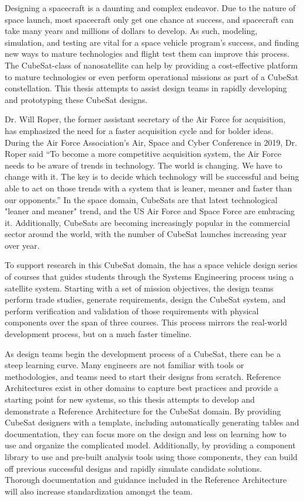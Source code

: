 Designing a spacecraft is a daunting and complex endeavor. Due to the nature of space launch, most spacecraft only get one chance at success, and spacecraft can take many years and millions of dollars to develop. As such, modeling, simulation, and testing are vital for a space vehicle program's success, and finding new ways to mature technologies and flight test them can improve this process. The CubeSat-class of nanosatellite can help by providing a cost-effective platform to mature technologies or even perform operational missions as part of a CubeSat constellation. This thesis attempts to assist design teams in rapidly developing and prototyping these CubeSat designs. 

Dr. Will Roper, the former assistant secretary of the Air Force for acquisition, has emphasized the need for a faster acquisition cycle and for bolder ideas. During the Air Force Association’s Air, Space and Cyber Conference in 2019, Dr. Roper said “To become a more competitive acquisition system, the Air Force needs to be aware of trends in technology. The world is changing. We have to change with it. The key is to decide which technology will be successful and being able to act on those trends with a system that is leaner, meaner and faster than our opponents.” \citep{Roper2019} In the space domain, CubeSats are that latest technological "leaner and meaner" trend, and the US Air Force and Space Force are embracing it. Additionally, CubeSats are becoming increasingly popular  in the commercial sector around the world, with the number of CubeSat launches increasing year over year.

To support research in this CubeSat domain, the  has a space vehicle design series of courses that guides students through the Systems Engineering process using a satellite system. Starting with a set of mission objectives, the design teams perform trade studies, generate requirements, design the CubeSat system, and perform verification and validation of those requirements with physical components over the span of three courses. This process mirrors the real-world development process, but on a much faster timeline. 

As design teams begin the development process of a CubeSat, there can be a steep learning curve. Many engineers are not familiar with  tools or methodologies, and teams need to start their designs from scratch. Reference Architectures exist in other domains to capture best practices and provide a starting point for new systems, so this thesis attempts to develop and demonstrate a Reference Architecture for the CubeSat domain. By providing CubeSat designers with a template, including automatically generating tables and documentation, they can focus more on the design and less on learning how to use and organize the complicated model. Additionally, by providing a component library to use and pre-built analysis tools using those components, they can build off previous successful designs and rapidly simulate candidate solutions. Thorough documentation and guidance included in the Reference Architecture will also increase standardization amongst the team. 

